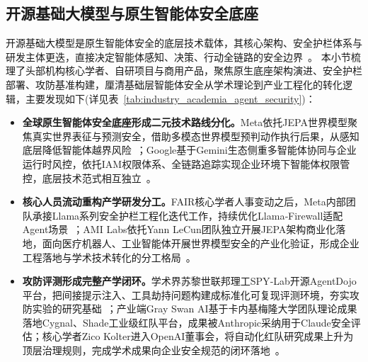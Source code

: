 ﻿\subsection{开源基础大模型与原生智能体安全底座}
开源基础大模型是原生智能体安全的底层技术载体，其核心架构、安全护栏体系与研发主体更迭，直接决定智能体感知、决策、行动全链路的安全边界~\cite{nyuLeCun2026,googleGeminiEnterpriseAgentPlatform2026}。
本小节梳理了头部机构核心学者、自研项目与商用产品，聚焦原生底座架构演进、安全护栏部署、攻防基准构建，厘清基础层智能体安全从学术理论到产业工程化的转化逻辑，主要发现如下(详见表~\ref{tab:industry_academia_agent_security})：
\begin{itemize}[tabitem]
    \item \textbf{全球原生智能体安全底座形成二元技术路线分化。}Meta依托JEPA世界模型聚焦真实世界表征与预测安全，借助多模态世界模型预判动作执行后果，从感知底层降低智能体越界风险~\cite{nyuLeCun2026,vjepa2025}；Google基于Gemini生态侧重多智能体协同与企业运行时风控，依托IAM权限体系、全链路追踪实现企业环境下智能体权限管控，底层技术范式相互独立~\cite{googleADK2025,deepmindCoScientist2025}。

    \item \textbf{核心人员流动重构产学研发分工。}FAIR核心学者人事变动之后，Meta内部团队承接Llama系列安全护栏工程化迭代工作，持续优化Llama‑Firewall适配Agent场景~\cite{pineauDeparture2025,metaLlamaFirewall2025}；AMI Labs依托Yann LeCun团队独立开展JEPA架构商业化落地，面向医疗机器人、工业智能体开展世界模型安全的产业化验证，形成企业工程落地与学术技术转化的分工格局~\cite{amiLabsFunding2026,lejepaIdentifiability2026}。

    \item \textbf{攻防评测形成完整产学闭环。}学术界苏黎世联邦理工SPY‑Lab开源AgentDojo平台，把间接提示注入、工具劫持问题构建成标准化可复现评测环境，夯实攻防实验的研究基础~\cite{agentdojoGithub2026}；产业端Gray Swan AI基于卡内基梅隆大学团队理论成果落地Cygnal、Shade工业级红队平台，成果被Anthropic采纳用于Claude安全评估；核心学者Zico Kolter进入OpenAI董事会，将自动化红队研究成果上升为顶层治理规则，完成学术成果向企业安全规范的闭环落地~\cite{latentspaceGrayswan2026,kolterWikipedia2026}。
\end{itemize}


\begingroup

